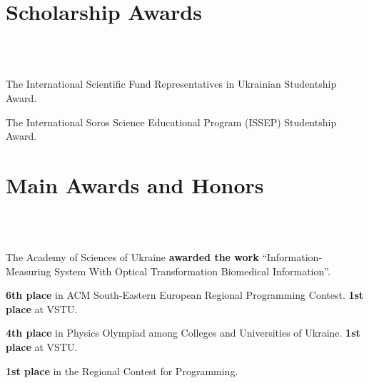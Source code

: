 \documentclass[10pt,overlapped,line]{res}
\newcommand{\mplace}[1]{\textbf{#1}}
\begin{document}
\begin{resume}
 \section{Scholarship Awards}
 \begin{format}
   \\
   \body\\
 \end{format}

 \employer{}
 \begin{position}
  The International Scientific Fund Representatives in Ukrainian Studentship Award.
 \end{position}

 \employer{}
 \begin{position}
  The International Soros Science Educational Program (ISSEP) Studentship Award.
 \end{position}


 \section{Main Awards and Honors}
 \begin{format}
    \\
   \body\\
 \end{format}

 \begin{position}
   The Academy of Sciences of Ukraine \mplace{awarded the work}
   ``Information-Measuring System With Optical Transformation
   Biomedical Information''.
 \end{position}

 \begin{position}
   \mplace{6th place} in ACM South-Eastern European Regional
   Programming Contest. \mplace{1st place} at VSTU.
 \end{position}

 \begin{position}
   \mplace{4th place} in Physics Olympiad among Colleges and
   Universities of Ukraine. \mplace{1st place} at VSTU.
 \end{position}

 \begin{position}
 \mplace{1st place} in the Regional Contest for Programming.
 \end{position}


\end{resume}
\end{document}
